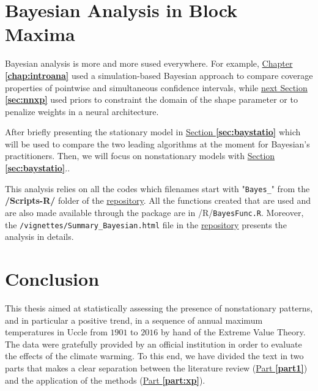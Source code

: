 \documentclass[11pt,a4paper,openany, twosided]{book}
\begin{document}
\chapter{Bayesian Analysis in Block Maxima}\label{sec:anabayes}
\minitoc \thispagestyle{empty}
 \vspace{1cm}
 
Bayesian analysis is more and more sused everywhere. For example,  \hyperref[chap:introana]{Chapter \textbf{\ref{chap:introana}}} used a simulation-based Bayesian approach to compare coverage properties of pointwise and simultaneous confidence intervals, while \hyperref[sec:nnxp]{next Section \textbf{\ref{sec:nnxp}}} used priors to constraint the domain of the shape parameter or to penalize weights in a neural architecture.

After briefly presenting the stationary model in \hyperref[sec:baystatio]{Section \textbf{\ref{sec:baystatio}}} which will be used to compare the two leading algorithms at the moment for Bayesian's practitioners. Then, we will focus on nonstationary models with \hyperref[sec:baystatio]{Section \textbf{\ref{sec:baystatio}}}..

This analysis relies on all the codes which filenames start with "\texttt{Bayes\_}" from the \textbf{/Scripts-R/} folder of the \href{https://github.com/proto4426/PissoortThesis/}{repository}. All the functions created that are used and are also made available through the package are in /R/\texttt{BayesFunc.R}. Moreover,
the \texttt{/vignettes/Summary\_Bayesian.html} file in the \href{https://github.com/proto4426/PissoortThesis/}{repository} presents the analysis in details.

\newpage





\chapter*{Conclusion}
\thispagestyle{empty}

This thesis aimed at statistically assessing the presence of nonstationary patterns, and in particular a positive trend, in a sequence of annual maximum temperatures in Uccle from $1901$ to $2016$ by hand of the Extreme Value Theory. The data were gratefully provided by an official institution in order to evaluate the effects of the climate warming.
To this end, we have divided the text in two parts that makes a clear separation between the literature review (\hyperref[part1]{Part \textbf{\ref{part1}}}) and the application of the methods (\hyperref[part:xp]{Part \textbf{\ref{part:xp}}}).
\end{document}
